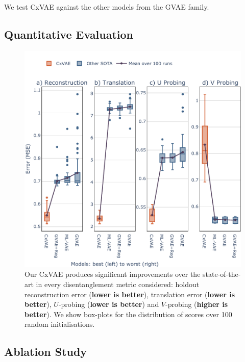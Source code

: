 \documentclass[nohyperref]{article}
\theoremstyle{plain}
\theoremstyle{definition}
\theoremstyle{remark}
\begin{document}
We test CxVAE against the other models from the GVAE family.

\subsection{Quantitative Evaluation}

\begin{figure}[t]
\vskip 0.2in
\begin{center}
\centerline{\includegraphics[width=\columnwidth]{files/results.pdf}}
\caption{Our CxVAE produces significant improvements over the state-of-the-art in every disentanglement metric considered: holdout reconstruction error (\textbf{lower is better}), translation error (\textbf{lower is better}), $U$-probing (\textbf{lower is better}) and $V$-probing (\textbf{higher is better}).  We show box-plots for the distribution of scores over 100 random initialisations. }
\label{results}
\end{center}
\vskip -0.2in
\end{figure}

\subsection{Ablation Study}
\end{document}
